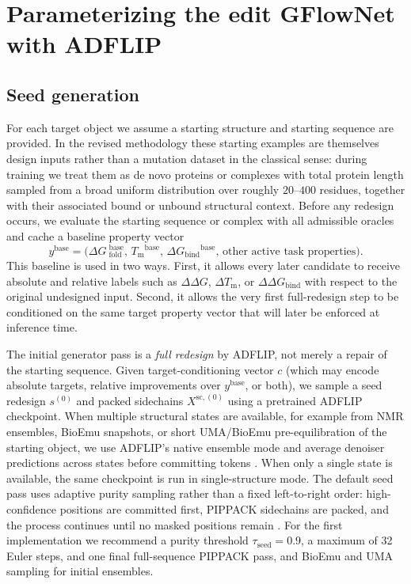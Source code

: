 \documentclass[11pt]{article}
\newcommand{\dG}{\ensuremath{\Delta G \ }}
\newcommand{\Tm}{\ensuremath{T_{\mathrm m}}}
\newcommand{\DGbind}{\ensuremath{\Delta G_{\mathrm{bind}}}}
\begin{document}
\section{Parameterizing the edit GFlowNet with ADFLIP}
\label{sec:param}


\subsection{Seed generation}

For each target object we assume a starting structure and starting sequence are provided. In the revised methodology these starting examples are themselves design inputs rather than a mutation dataset in the classical sense: during training we treat them as de novo proteins or complexes with total protein length sampled from a broad uniform distribution over roughly $20$--$400$ residues, together with their associated bound or unbound structural context. Before any redesign occurs, we evaluate the starting sequence or complex with all admissible oracles and cache a baseline property vector
\begin{equation}
    y^{\mathrm{base}} = \big(\dG_{\mathrm{fold}}^{\mathrm{base}},\,\Tm^{\mathrm{base}},\,\DGbind^{\mathrm{base}},\,\text{other active task properties}\big).
\end{equation}
This baseline is used in two ways. First, it allows every later candidate to receive absolute and relative labels such as $\Delta\Delta G$, $\Delta \Tm$, or $\Delta\Delta G_{\mathrm{bind}}$ with respect to the original undesigned input. Second, it allows the very first full-redesign step to be conditioned on the same target property vector that will later be enforced at inference time.

The initial generator pass is a \emph{full redesign} by ADFLIP, not merely a repair of the starting sequence. Given target-conditioning vector $c$ (which may encode absolute targets, relative improvements over $y^{\mathrm{base}}$, or both), we sample a seed redesign $s^{(0)}$ and packed sidechains $X^{\mathrm{sc},(0)}$ using a pretrained ADFLIP checkpoint. When multiple structural states are available, for example from NMR ensembles, BioEmu snapshots, or short UMA/BioEmu pre-equilibration of the starting object, we use ADFLIP's native ensemble mode and average denoiser predictions across states before committing tokens \citep{yi2025adflip}. When only a single state is available, the same checkpoint is run in single-structure mode. The default seed pass uses adaptive purity sampling rather than a fixed left-to-right order: high-confidence positions are committed first, PIPPACK sidechains are packed, and the process continues until no masked positions remain \citep{yi2025adflip,randolph2024pippack}. For the first implementation we recommend a purity threshold $\tau_{\mathrm{seed}}=0.9$, a maximum of 32 Euler steps, and one final full-sequence PIPPACK pass, and BioEmu and UMA sampling for initial ensembles. 
\end{document}
